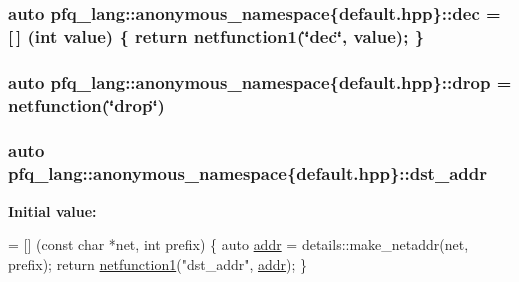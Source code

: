 \hypertarget{namespacepfq__lang_1_1anonymous__namespace_02default_8hpp_03_a6e71e558e459e950a4e9beeaaaf12cf6}{
\subsubsection[{dec}]{\setlength{\rightskip}{0pt plus 5cm}auto pfq\-\_\-lang\-::anonymous\-\_\-namespace\{default.\-hpp\}\-::dec = \mbox{[}$\,$\mbox{]} (int value) \{ return {\bf netfunction1}(\char`\"{}dec\char`\"{}, value); \}}}\label{namespacepfq__lang_1_1anonymous__namespace_02default_8hpp_03_a6e71e558e459e950a4e9beeaaaf12cf6}
\hypertarget{namespacepfq__lang_1_1anonymous__namespace_02default_8hpp_03_abed0412f2864624f755594077d255b1e}{
\subsubsection[{drop}]{\setlength{\rightskip}{0pt plus 5cm}auto pfq\-\_\-lang\-::anonymous\-\_\-namespace\{default.\-hpp\}\-::drop = {\bf netfunction}(\char`\"{}drop\char`\"{})}}\label{namespacepfq__lang_1_1anonymous__namespace_02default_8hpp_03_abed0412f2864624f755594077d255b1e}
\hypertarget{namespacepfq__lang_1_1anonymous__namespace_02default_8hpp_03_a4b72bac7c3af312ffe7c670eb2583f9a}{
\subsubsection[{dst\-\_\-addr}]{\setlength{\rightskip}{0pt plus 5cm}auto pfq\-\_\-lang\-::anonymous\-\_\-namespace\{default.\-hpp\}\-::dst\-\_\-addr}}\label{namespacepfq__lang_1_1anonymous__namespace_02default_8hpp_03_a4b72bac7c3af312ffe7c670eb2583f9a}
{\bfseries Initial value\-:}
\begin{DoxyCode}
= [] (\textcolor{keyword}{const} \textcolor{keywordtype}{char} *net, \textcolor{keywordtype}{int} prefix)
        \{
            \textcolor{keyword}{auto} \hyperlink{namespacepfq__lang_1_1anonymous__namespace_02default_8hpp_03_aafce8334d1be83bff9a2115439c8c453}{addr} = details::make\_netaddr(net, prefix);
            \textcolor{keywordflow}{return} \hyperlink{namespacepfq__lang_af215f25fa7ebd61fdc90cf0ef78a3164}{netfunction1}(\textcolor{stringliteral}{"dst\_addr"}, \hyperlink{namespacepfq__lang_1_1anonymous__namespace_02default_8hpp_03_aafce8334d1be83bff9a2115439c8c453}{addr});
        \}
\end{DoxyCode}
